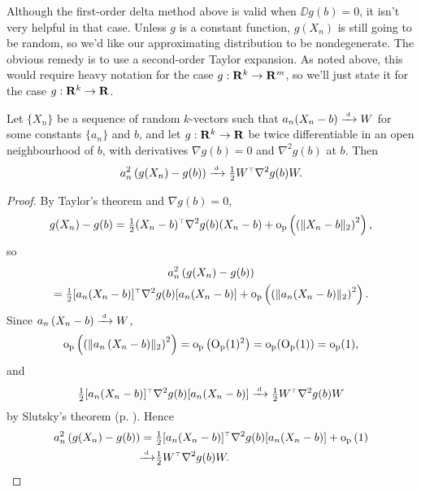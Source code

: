 \documentclass[11pt,letterpaper,reqno,oneside]{article}
\begin{document}
Although the first-order delta method above is valid when $\DD g(b)=0$, it isn't very helpful in that case. Unless $g$ is a constant function, $g(X_n)$ is still going to be random, so we'd like our approximating distribution to be nondegenerate. The obvious remedy is to use a second-order Taylor expansion. As noted above, this would require heavy notation for the case $g : \mathbf{R}^k \to \mathbf{R}^m$, so we'll just state it for the case $g : \mathbf{R}^k \to \mathbf{R}$.
%
\begin{proposition}
	Let $\{ X_n \}$ be a sequence of random $k$-vectors such that $a_n ( X_n - b ) \xrightarrow{{\scriptscriptstyle \mathrm{\;d\;}}} W$ for some constants $\{ a_n \}$ and $b$, and let $g: \mathbf{R}^k \to \mathbf{R}$ be twice differentiable in an open neighbourhood of $b$, with derivatives $\nabla g(b)=0$ and $\nabla^2 g(b)$ at $b$. Then
	\begin{equation*}
		a_n^2 \left( g(X_n) - g(b) \right)
		\xrightarrow{{\scriptscriptstyle \mathrm{\;d\;}}} \tfrac{1}{2} W^{\scriptscriptstyle \top} \nabla^2 g(b) W .
	\end{equation*}
\end{proposition}


\begin{proof}
	By Taylor's theorem and $\nabla g(b)=0$,
	\begin{equation*}
		g(X_n) - g(b) 
		= \tfrac{1}{2} (X_n-b)^{\scriptscriptstyle \top} \nabla^2 g(b) (X_n-b)
		+ \mathrm{o}_{\mathrm{p}}\left( \left( \lVert X_n-b\rVert_2 \right)^2 \right) ,
	\end{equation*}
	so
	\begin{multline*}
		a_n^2 \left( g(X_n) - g(b) \right)
		\\
		= \tfrac{1}{2} [a_n (X_n-b)]^{\scriptscriptstyle \top} \nabla^2 g(b) [a_n (X_n-b)]
		+ \mathrm{o}_{\mathrm{p}}\left( \left( \lVert a_n(X_n-b)\rVert_2 \right)^2 \right) .
	\end{multline*}
	Since $a_n \left( X_n-b \right) \xrightarrow{{\scriptscriptstyle \mathrm{\;d\;}}} W$,
	\begin{equation*}
		\mathrm{o}_{\mathrm{p}}\left( \left( \lVert a_n \left( X_n-b \right) \rVert_2 \right)^2 \right) 
		= \mathrm{o}_{\mathrm{p}}\left( \mathrm{O}_{\mathrm{p}}(1)^2 \right) 
		= \mathrm{o}_{\mathrm{p}}( \mathrm{O}_{\mathrm{p}}(1) ) 
		= \mathrm{o}_{\mathrm{p}}(1) ,
	\end{equation*}
	and
	\begin{equation*}
		\tfrac{1}{2} [a_n (X_n-b)]^{\scriptscriptstyle \top} \nabla^2 g(b) [a_n (X_n-b)] 
		\xrightarrow{{\scriptscriptstyle \mathrm{\;d\;}}} \tfrac{1}{2} W^{\scriptscriptstyle \top} \nabla^2 g(b) W
	\end{equation*}
	by Slutsky's theorem (p. \pageref{corollary:Slutsky}). Hence
	\begin{align*}
		a_n^2 \left( g(X_n) - g(b) \right)
		={}& \tfrac{1}{2} [a_n (X_n-b)]^{\scriptscriptstyle \top} \nabla^2 g(b) [a_n (X_n-b)]
		+ \mathrm{o}_{\mathrm{p}}\left( 1 \right) 
		\\
		\xrightarrow{{\scriptscriptstyle \mathrm{\;d\;}}}& \tfrac{1}{2} W^{\scriptscriptstyle \top} \nabla^2 g(b) W . \qedhere
	\end{align*}
\end{proof}
\end{document}
